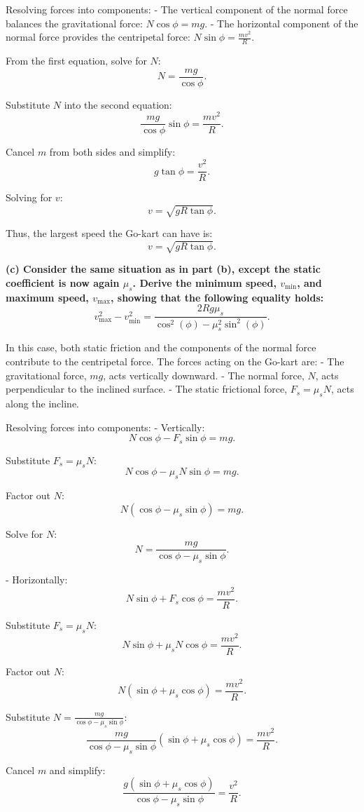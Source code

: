 Resolving forces into components:
- The vertical component of the normal force balances the gravitational force: $N \cos\phi = mg$.
- The horizontal component of the normal force provides the centripetal force: $N \sin\phi = \frac{mv^2}{R}$.

From the first equation, solve for $N$:
\[
N = \frac{mg}{\cos\phi}.
\]

Substitute $N$ into the second equation:
\[
\frac{mg}{\cos\phi} \sin\phi = \frac{mv^2}{R}.
\]

Cancel $m$ from both sides and simplify:
\[
g \tan\phi = \frac{v^2}{R}.
\]

Solving for $v$:
\[
v = \sqrt{gR \tan\phi}.
\]

Thus, the largest speed the Go-kart can have is:
\[
\boxed{v = \sqrt{gR \tan\phi}}.
\]

\textbf{(c) Consider the same situation as in part (b), except the static coefficient is now again $\mu_s$. Derive the minimum speed, $v_{\text{min}}$, and maximum speed, $v_{\text{max}}$, showing that the following equality holds:}
\[
v_{\text{max}}^2 - v_{\text{min}}^2 = \frac{2Rg\mu_s}{\cos^2(\phi) - \mu_s^2\sin^2(\phi)}.
\]

In this case, both static friction and the components of the normal force contribute to the centripetal force. The forces acting on the Go-kart are:
- The gravitational force, $mg$, acts vertically downward.
- The normal force, $N$, acts perpendicular to the inclined surface.
- The static frictional force, $F_s = \mu_s N$, acts along the incline.

Resolving forces into components:
- Vertically:
\[
N \cos\phi - F_s \sin\phi = mg.
\]

Substitute $F_s = \mu_s N$:
\[
N \cos\phi - \mu_s N \sin\phi = mg.
\]

Factor out $N$:
\[
N (\cos\phi - \mu_s \sin\phi) = mg.
\]

Solve for $N$:
\[
N = \frac{mg}{\cos\phi - \mu_s \sin\phi}.
\]

- Horizontally:
\[
N \sin\phi + F_s \cos\phi = \frac{mv^2}{R}.
\]

Substitute $F_s = \mu_s N$:
\[
N \sin\phi + \mu_s N \cos\phi = \frac{mv^2}{R}.
\]

Factor out $N$:
\[
N (\sin\phi + \mu_s \cos\phi) = \frac{mv^2}{R}.
\]

Substitute $N = \frac{mg}{\cos\phi - \mu_s \sin\phi}$:
\[
\frac{mg}{\cos\phi - \mu_s \sin\phi} (\sin\phi + \mu_s \cos\phi) = \frac{mv^2}{R}.
\]

Cancel $m$ and simplify:
\[
\frac{g (\sin\phi + \mu_s \cos\phi)}{\cos\phi - \mu_s \sin\phi} = \frac{v^2}{R}.
\]

